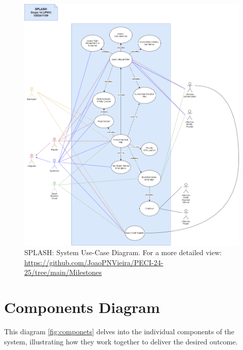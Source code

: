\begin{figure}[H]
      \centering
      \includegraphics[width=16cm]{figs/use_case_diagram.png}
      \caption{SPLASH: System Use-Case Diagram. For a more detailed view: \url{https://github.com/JoaoPNVieira/PECI-24-25/tree/main/Milestones}}
      \label{fig:use_case_diagram}
\end{figure}

\newpage
\section{Components Diagram}
This diagram \ref{fig:componets} delves into the individual components of the system, illustrating how they work together to deliver the desired outcome.

